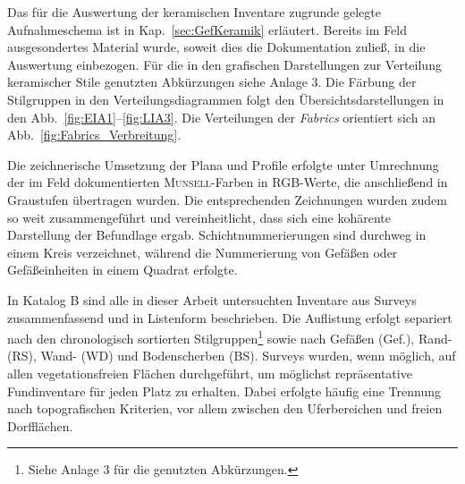 \begin{multicols}{2}
Das für die Auswertung der keramischen Inventare zugrunde gelegte Aufnahmeschema ist in Kap.~\ref{sec:GefKeramik} erläutert. Bereits im Feld ausgesondertes Material wurde, soweit dies die Dokumentation zuließ, in die Auswertung einbezogen. Für die in den grafischen Darstellungen zur Verteilung keramischer Stile genutzten Abkürzungen siehe Anlage 3. Die Färbung der Stilgruppen in den Verteilungsdiagrammen folgt den Übersichtsdarstellungen in den Abb.~\ref{fig:EIA1}--\ref{fig:LIA3}. Die Verteilungen der \textit{Fabrics} orientiert sich an Abb.~\ref{fig:Fabrics_Verbreitung}.

Die zeichnerische Umsetzung der Plana und Profile erfolgte unter Umrechnung der im Feld dokumentierten \textsc{Munsell}-Farben in RGB-Werte, die anschließend in Graustufen übertragen wurden. Die entsprechenden Zeichnungen wurden zudem so weit zusammengeführt und vereinheitlicht, dass sich eine kohärente Darstellung der Befundlage ergab. Schichtnummerierungen sind durchweg in einem Kreis verzeichnet, während die Nummerierung von Gefäßen oder Gefäßeinheiten in einem Quadrat erfolgte.

In Katalog B sind alle in dieser Arbeit untersuchten Inventare aus Surveys zusammenfassend und in Listenform beschrieben. Die Auflistung erfolgt separiert nach den chronologisch sortierten Stilgruppen\footnote{Siehe Anlage 3 für die genutzten Abkürzungen.} sowie nach Gefäßen (Gef.), Rand- (RS), Wand- (WD) und Bodenscherben (BS). Surveys wurden, wenn möglich, auf allen vegetationsfreien Flächen durchgeführt, um möglichst repräsentative Fundinventare für jeden Platz zu erhalten. Dabei erfolgte häufig eine Trennung nach topografischen Kriterien, vor allem zwischen den Uferbereichen und freien Dorfflächen.%
\end{multicols}
\newpage
\begin{multicols}{2}
\raggedcolumns






































\end{multicols}

